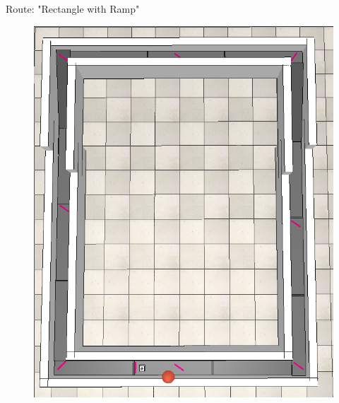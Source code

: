 \documentclass[10pt]{beamer}
\begin{document}
\begin{frame}{Route: "Rectangle with Ramp"}
    \begin{figure}
        \centering
        \includegraphics[angle=90,width=0.9\linewidth]{rectangle_with_ramp.png}
    \end{figure}
\end{frame}
\end{document}
